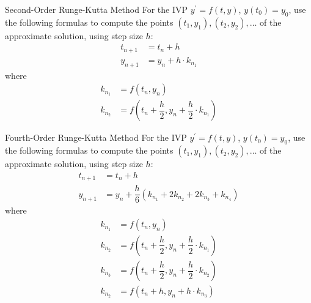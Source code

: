 \documentclass{beamer}
\begin{document}
\begin{frame}
\begin{block}{Second-Order Runge-Kutta Method}
For the IVP $y^\prime=f(t,y)$, $y(t_0)=y_0$, use the following formulas to compute the points $(t_1,y_1), (t_2,y_2),\dots$ of the approximate solution, using step size $h$:
\begin{align*}
t_{n+1}&=t_n+h\\
y_{n+1}&=y_n+h\cdot k_{n_1}
\end{align*}
where
\begin{align*}
k_{n_1}&=f(t_n,y_n)\\
k_{n_2}&=f\left(t_n+\dfrac{h}{2},y_n+\dfrac{h}{2}\cdot k_{n_1}\right)
\end{align*}
\end{block}
\end{frame}

\begin{frame}
\begin{block}{Fourth-Order Runge-Kutta Method}
For the IVP $y^\prime=f(t,y)$, $y(t_0)=y_0$, use the following formulas to compute the points $(t_1,y_1), (t_2,y_2),\dots$ of the approximate solution, using step size $h$:
\begin{align*}
t_{n+1}&=t_n+h\\
y_{n+1}&=y_n+\dfrac{h}{6}(k_{n_1}+2k_{n_2}+2k_{n_3}+k_{n_4})
\end{align*}
where
\begin{equation*}
\begin{aligned}
k_{n_1}&=f(t_n,y_n)\\
k_{n_2}&=f\left(t_n+\dfrac{h}{2},y_n+\dfrac{h}{2}\cdot k_{n_1}\right)\\
k_{n_3}&=f\left(t_n+\dfrac{h}{2},y_n+\dfrac{h}{2}\cdot k_{n_2}\right)\\
k_{n_2}&=f\left(t_n+h,y_n+h\cdot k_{n_3}\right)
\end{aligned}
\end{equation*}
\end{block}
\end{frame}
\end{document}
